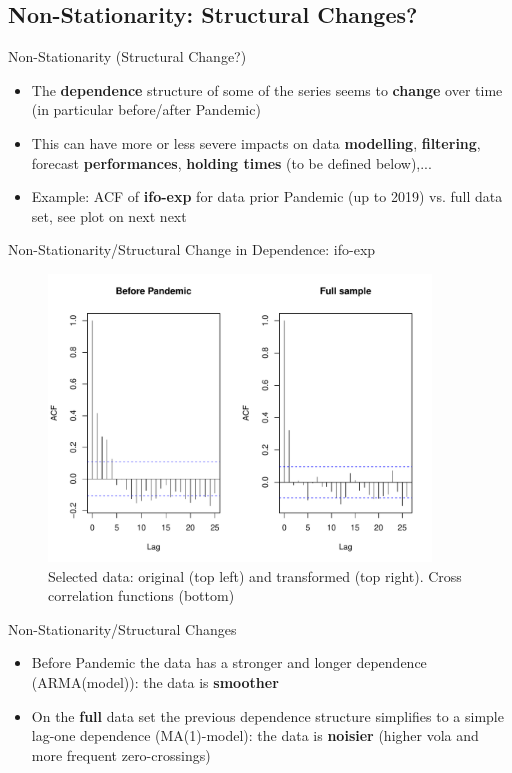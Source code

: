 \documentclass{beamer}
\begin{document}
\subsection{Non-Stationarity: Structural Changes?}

\begin{frame} {Non-Stationarity (Structural Change?)}
\begin{itemize}
\item The \textbf{dependence} structure of some of the series seems to \textbf{change} over time (in particular before/after Pandemic)
\item This can have more or less severe impacts on data \textbf{modelling}, \textbf{filtering}, forecast \textbf{performances}, \textbf{holding times} (to be defined below),...
\item Example: {ACF} of \textbf{ifo-exp} for data prior Pandemic (up to 2019) vs. full data set, see plot on next next 
\end{itemize}
\end{frame}



\begin{frame} {Non-Stationarity/Structural Change in Dependence: ifo-exp}
\begin{figure}[H]\begin{center}\includegraphics[height=3in, width=4in]{ACF_non_stat.pdf}\caption{Selected data: original (top left) and transformed (top right). Cross correlation functions (bottom) \label{cor}}\end{center}\end{figure}\end{frame}


\begin{frame} {Non-Stationarity/Structural Changes}
\begin{itemize}
\item Before Pandemic the data has a stronger and longer dependence (ARMA(model)): the data is \textbf{smoother}
\item On the \textbf{full} data set  the previous dependence structure simplifies to a simple lag-one dependence (MA(1)-model): the data is \textbf{noisier} (higher vola and more frequent zero-crossings)
\end{itemize}
\end{frame}
\end{document}
